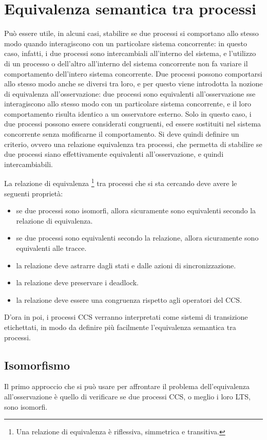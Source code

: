 \section{Equivalenza semantica tra processi}
Può essere utile, in alcuni casi, stabilire se due processi si comportano allo
stesso modo quando interagiscono con un particolare sistema concorrente:
in questo caso, infatti, i due processi sono intercambiali all'interno del
sistema, e l'utilizzo di un processo o dell'altro all'interno del sistema
concorrente non fa variare il comportamento dell'intero sistema concorrente.
Due processi possono comportarsi allo stesso modo anche se diversi tra
loro, e per questo viene introdotta la nozione di equivalenza all'osservazione:
due processi sono equivalenti all'osservazione sse interagiscono allo stesso
modo con un particolare sistema concorrente, e il loro comportamento
risulta identico a un osservatore esterno. Solo in questo caso,
i due processi possono essere considerati congruenti, ed essere sostituiti
nel sistema concorrente senza mofificarne il comportamento.
Si deve quindi definire un criterio, ovvero una relazione equivalenza
tra processi, che permetta di stabilire se due processi siano effettivamente
equivalenti all'osservazione, e quindi intercambiabili.

La relazione di equivalenza \footnote{Una relazione di equivalenza è riflessiva,
simmetrica e transitiva.}
tra processi che si sta cercando deve avere
le seguenti proprietà:
\begin{itemize}
    \item se due processi sono isomorfi, allora sicuramente sono equivalenti
    secondo la relazione di equivalenza.
    \item se due processi sono equivalenti secondo la relazione, allora
    sicuramente sono equivalenti alle tracce.
    \item la relazione deve astrarre dagli stati e dalle azioni di sincronizzazione.
    \item la relazione deve preservare i deadlock.
    \item la relazione deve essere una congruenza rispetto agli operatori del
    CCS.
\end{itemize}

D'ora in poi, i processi CCS verranno interpretati come sistemi di transizione
etichettati, in modo da definire più facilmente l'equivalenza semantica
tra processi.

\subsection*{Isomorfismo}
Il primo approccio che si può usare per affrontare il problema dell'equivalenza
all'osservazione è quello di verificare se due processi CCS, o meglio i loro
LTS, sono isomorfi.

